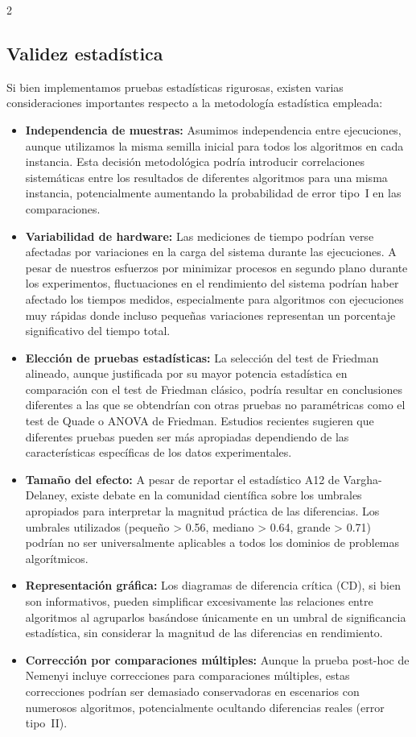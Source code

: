 \documentclass[10pt,a4paper]{extarticle}
\begin{document}
{\begin{multicols}{2}
\subsection{Validez estadística}
Si bien implementamos pruebas estadísticas rigurosas, existen varias consideraciones importantes respecto a la metodología estadística empleada:
\begin{itemize}
\item \textbf{Independencia de muestras:} Asumimos independencia entre ejecuciones, aunque utilizamos la misma semilla inicial para todos los algoritmos en cada instancia. Esta decisión metodológica podría introducir correlaciones sistemáticas entre los resultados de diferentes algoritmos para una misma instancia, potencialmente aumentando la probabilidad de error tipo~I en las comparaciones.
\item \textbf{Variabilidad de hardware:} Las mediciones de tiempo podrían verse afectadas por variaciones en la carga del sistema durante las ejecuciones. A pesar de nuestros esfuerzos por minimizar procesos en segundo plano durante los experimentos, fluctuaciones en el rendimiento del sistema podrían haber afectado los tiempos medidos, especialmente para algoritmos con ejecuciones muy rápidas donde incluso pequeñas variaciones representan un porcentaje significativo del tiempo total.
\item \textbf{Elección de pruebas estadísticas:} La selección del test de Friedman alineado, aunque justificada por su mayor potencia estadística en comparación con el test de Friedman clásico, podría resultar en conclusiones diferentes a las que se obtendrían con otras pruebas no paramétricas como el test de Quade o ANOVA de Friedman. Estudios recientes sugieren que diferentes pruebas pueden ser más apropiadas dependiendo de las características específicas de los datos experimentales.
\item \textbf{Tamaño del efecto:} A pesar de reportar el estadístico A12 de Vargha-Delaney, existe debate en la comunidad científica sobre los umbrales apropiados para interpretar la magnitud práctica de las diferencias. Los umbrales utilizados (pequeño > 0.56, mediano > 0.64, grande > 0.71) podrían no ser universalmente aplicables a todos los dominios de problemas algorítmicos.
\item \textbf{Representación gráfica:} Los diagramas de diferencia crítica (CD), si bien son informativos, pueden simplificar excesivamente las relaciones entre algoritmos al agruparlos basándose únicamente en un umbral de significancia estadística, sin considerar la magnitud de las diferencias en rendimiento.
\item \textbf{Corrección por comparaciones múltiples:} Aunque la prueba post-hoc de Nemenyi incluye correcciones para comparaciones múltiples, estas correcciones podrían ser demasiado conservadoras en escenarios con numerosos algoritmos, potencialmente ocultando diferencias reales (error tipo~II).
\end{itemize}


\end{multicols}}
\end{document}

